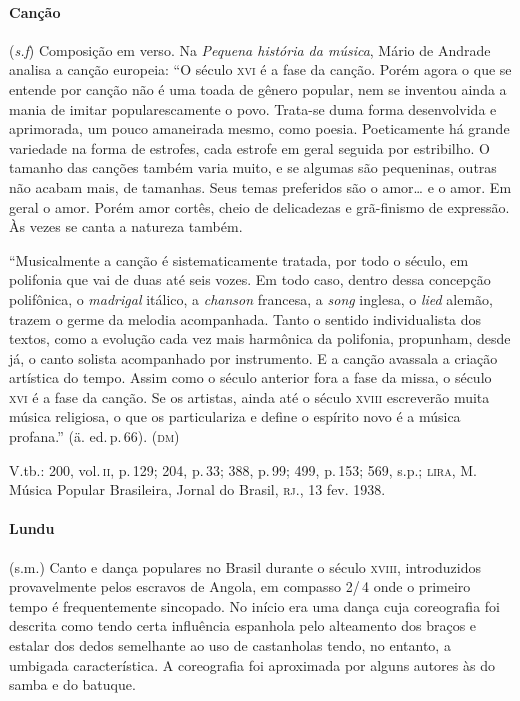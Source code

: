 \paragraph{Canção} (\textit{s.f}) Composição em verso. Na \textit{Pequena
história da música}, Mário de Andrade analisa a canção europeia: ``O
século \textsc{xvi} é a fase da canção. Porém agora o que se entende por canção não
é uma toada de gênero popular, nem se inventou ainda a mania de imitar
popularescamente o povo. Trata-se duma forma desenvolvida e aprimorada,
um pouco amaneirada mesmo, como poesia. Poeticamente há grande variedade
na forma de estrofes, cada estrofe em geral seguida por estribilho. O
tamanho das canções também varia muito, e se algumas são pequeninas,
outras não acabam mais, de tamanhas. Seus temas preferidos são o
amor\ldots{} e o amor. Em geral o amor. Porém amor cortês, cheio de
delicadezas e grã-finismo de expressão. Às vezes se canta a natureza
também.

``Musicalmente a canção é sistematicamente tratada, por todo o século,
em polifonia que vai de duas até seis vozes. Em todo caso, dentro dessa
concepção polifônica, o \textit{madrigal} itálico, a \textit{chanson} francesa, a \textit{song}
inglesa, o \textit{lied} alemão, trazem o germe da melodia acompanhada. Tanto o
sentido individualista dos textos, como a evolução cada vez mais
harmônica da polifonia, propunham, desde já, o canto solista acompanhado
por instrumento. E a canção avassala a criação artística do tempo. Assim
como o século anterior fora a fase da missa, o século \textsc{xvi} é a fase da
canção. Se os artistas, ainda até o século \textsc{xviii} escreverão muita música
religiosa, o que os particulariza e define o espírito novo é a música
profana.'' (ä. ed.\,p.\,66). (\textsc{dm})

V.tb.: 200, vol.\,\textsc{ii}, p.\,129; 204, p.\,33; 388, p.\,99; 499, p.\,153; 569,
s.p.; \textsc{lira}, M. Música Popular Brasileira, Jornal do Brasil, \textsc{rj}., 13 fev.
1938.

\paragraph{Lundu} (s.m.) Canto e dança populares no Brasil durante o século
\textsc{xviii}, introduzidos provavelmente pelos escravos de Angola, em compasso
2/\,4 onde o primeiro tempo é frequentemente sincopado. No início era uma
dança cuja coreografia foi descrita como tendo certa influência
espanhola pelo alteamento dos braços e estalar dos dedos semelhante ao
uso de castanholas tendo, no entanto, a umbigada característica. A
coreografia foi aproximada por alguns autores às do samba e do
batuque.

